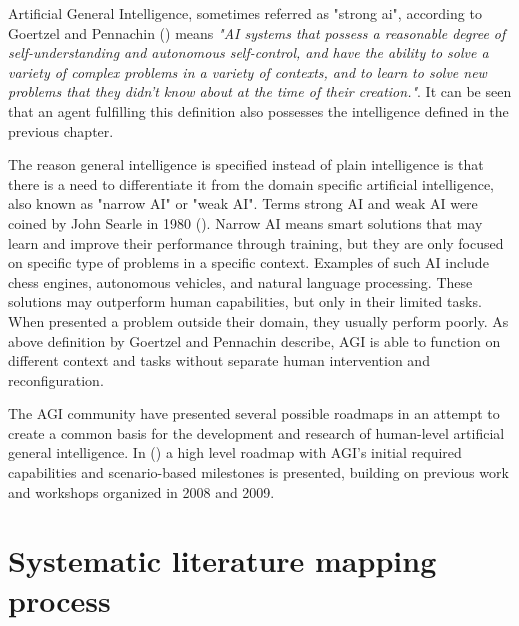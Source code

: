 \documentclass[utf8,english]{gradu3}
\begin{document}




Artificial General Intelligence, sometimes referred as "strong ai", according to Goertzel and Pennachin (\cite*{goertzel2007}) means \emph{"AI systems that possess a reasonable degree of self-understanding and autonomous self-control, and have the ability to solve a variety of complex problems in a variety of contexts, and to learn to solve new problems that they didn't know about at the time of their creation."}. It can be seen that an agent fulfilling this definition also possesses the intelligence defined in the previous chapter.

 The reason general intelligence is specified instead of plain intelligence is that there is a need to differentiate it from the domain specific artificial intelligence, also known as "narrow AI" or "weak AI". Terms strong AI and weak AI were coined by John Searle in 1980 (\cite{searle1980}). Narrow AI means smart solutions that may learn and improve their performance through training, but they are only focused on specific type of problems in a specific context. Examples of such AI include chess engines, autonomous vehicles, and natural language processing. These solutions may outperform human capabilities, but only in their limited tasks. When presented a problem outside their domain, they usually perform poorly.
As above definition by Goertzel and Pennachin describe, AGI is able to function on different context and tasks without separate human intervention and reconfiguration.


The AGI community have presented several possible roadmaps in an attempt to create a common basis for the development and research of human-level artificial general intelligence. In (\cite{adams2012}) a high level roadmap with AGI's initial required capabilities and scenario-based milestones is presented, building on previous work and workshops organized in 2008 and 2009. 

\chapter{Systematic literature mapping process}
\end{document}
